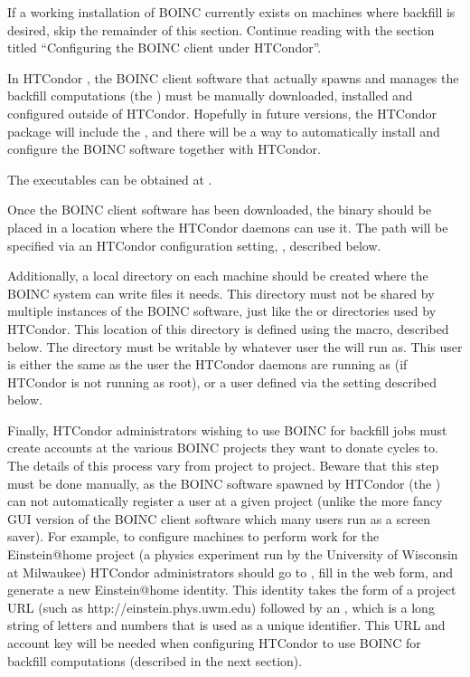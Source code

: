 
If a working installation of BOINC currently exists on machines
where backfill is desired,
skip the remainder of this section.
Continue reading with the section titled ``Configuring the BOINC
client under HTCondor''.

In HTCondor \VersionNotice, the BOINC client software that actually
spawns and manages the backfill computations (the
) must be manually downloaded, installed and
configured outside of HTCondor.
Hopefully in future versions, the HTCondor package will include the
, and there will be a way to automatically install
and configure the BOINC software together with HTCondor.

The  executables can be obtained at 
.

Once the BOINC client software has been downloaded, the
 binary should be placed in a location where the
HTCondor daemons can use it.
The path will be specified via an HTCondor configuration setting,
, described below.

Additionally, a local directory on each machine should be created
where the BOINC system can write files it needs.
This directory must not be shared by multiple instances of the BOINC
software, just like the  or  directories
used by HTCondor.
This location of this directory is defined using the
 macro, described below.
The directory must be writable by whatever user the
 will run as.
This user is either the same as the user the HTCondor daemons are
running as (if HTCondor is not running as root), or a user defined via
the  setting described below.

Finally, HTCondor administrators wishing to use BOINC for backfill jobs
must create accounts at the various BOINC projects they want to donate
cycles to.
The details of this process vary from project to project.
Beware that this step must be done manually, as the BOINC software
spawned by HTCondor (the ) can not automatically
register a user at a given project (unlike the more fancy GUI version
of the BOINC client software which many users run as a screen saver). 
For example, to configure machines to perform work for the
Einstein@home project (a physics experiment run by the University of
Wisconsin at Milwaukee) HTCondor administrators should go to
, fill in
the web form, and generate a new Einstein@home identity.
This identity takes the form of a project URL (such as
http://einstein.phys.uwm.edu) followed by an ,
which is a long string of letters and numbers that is used as a unique
identifier. 
This URL and account key will be needed when configuring HTCondor to use
BOINC for backfill computations (described in the next section).



